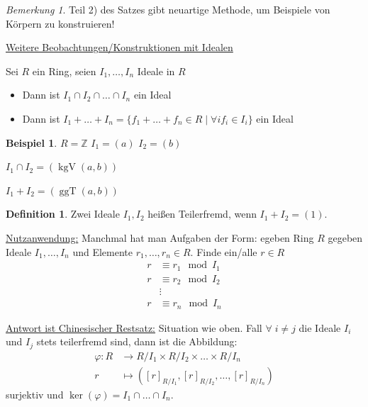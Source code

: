 \documentclass[12pt,parskip=full]{scrartcl}
\newcommand{\setZ}{\mathbb{Z}}
\newcommand{\heading}{\underline}
\theoremstyle{definition}
\newtheorem{definition}[theorem]{Definition}
\newtheorem{example}[theorem]{Beispiel}
\theoremstyle{remark}
\newtheorem*{remark}{Bemerkung}
\begin{document}
	\begin{remark}
		Teil 2) des Satzes gibt neuartige Methode, um Beispiele von Körpern zu konstruieren!
	\end{remark}

	\heading{Weitere Beobachtungen/Konstruktionen mit Idealen}
	
	Sei $R$ ein Ring, seien $I_1, \dots, I_n$ Ideale in $R$
	\begin{itemize}
		\item Dann ist $I_1 \cap I_2 \cap \dots \cap I_n$ ein Ideal
		\item Dann ist $I_1 + \dots + I_n = \{ f_1 + \dots + f_n \in R \mid \forall i f_i \in I_i \}$ ein Ideal
	\end{itemize}

	\begin{example}
		$R = \setZ$ $I_1 = (a)$ $I_2 = (b)$
		
		$I_1 \cap I_2 = (\operatorname{kgV}(a,b))$
		
		$I_1 + I_2 = (\operatorname{ggT}(a,b))$
	\end{example}

	\begin{definition}
		Zwei Ideale $I_1, I_2$ heißen Teilerfremd, wenn $I_1 + I_2 = (1)$.
	\end{definition}

	\heading{Nutzanwendung:} Manchmal hat man Aufgaben der Form: egeben Ring $R$ gegeben Ideale $I_1, \dots, I_n$ und Elemente $r_1, \dots, r_n \in R$. Finde ein/alle $r \in R$
	\begin{align*}
		r &\equiv r_1 \mod I_1 \\
		r &\equiv r_2 \mod I_2 \\
		&\vdots \\
		r &\equiv r_n \mod I_n
	\end{align*}
	
	\heading{Antwort ist Chinesischer Restsatz:} Situation wie oben. Fall $\forall \; i \neq j$ die Ideale $I_i$ und $I_j$ stets teilerfremd sind, dann ist die Abbildung:
	\begin{align*}
		\varphi: R &\to R/I_1 \times R/I_2 \times \dots \times R/I_n \\
		r &\mapsto ([r]_{R/I_1}, [r]_{R/I_2}, \dots, [r]_{R/I_n})
	\end{align*}
	surjektiv und $\ker(\varphi) = I_1 \cap \dots \cap I_n$.
	
\end{document}
